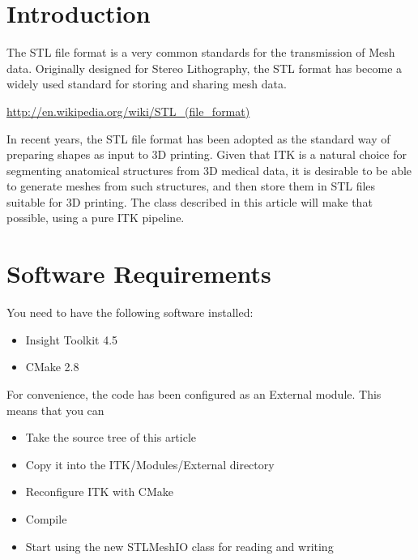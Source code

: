 \documentclass{InsightArticle}
\newcommand{\IJhandlerIDnumber}{1338}
\begin{document}
\IJhandlenote{\IJhandlerIDnumber}

\tableofcontents

\section{Introduction}

The STL file format is a very common standards for the transmission of Mesh
data.  Originally designed for Stereo Lithography, the STL format has become a
widely used standard for storing and sharing mesh data.

\begin{center}
\url{http://en.wikipedia.org/wiki/STL_(file_format)}
\end{center}

In recent years, the STL file format has been adopted as the standard way of
preparing shapes as input to 3D printing. Given that ITK is a natural choice
for segmenting anatomical structures from 3D medical data, it is desirable to
be able to generate meshes from such structures, and then store them in STL
files suitable for 3D printing. The class described in this article will make
that possible, using a pure ITK pipeline.


\section{Software Requirements}

You need to have the following software installed:

\begin{itemize}
  \item  Insight Toolkit 4.5
  \item  CMake 2.8
\end{itemize}

For convenience, the code has been configured as an External module. This means
that you can

\begin{itemize}
\item Take the source tree of this article
\item Copy it into the ITK/Modules/External directory
\item Reconfigure ITK with CMake
\item Compile
\item Start using the new STLMeshIO class for reading and writing
\end{itemize}
\end{document}
